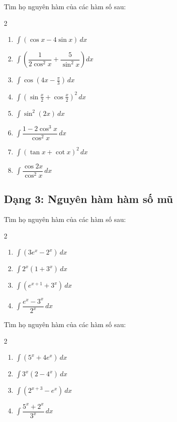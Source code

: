 \documentclass[12pt]{article}
\begin{document}
	\begin{btdo}
		Tìm họ nguyên hàm của các hàm số sau:
		\begin{multicols}{2}
			\begin{enumerate}[label=\alph*)]
				\item $\displaystyle \int (\cos x - 4\sin x) \,dx$
				\item $\displaystyle \int \left( \dfrac{1}{2\cos^2 x} + \dfrac{5}{\sin^2 x} \right) dx$
				\item $\displaystyle \int \cos\left(4x - \frac{\pi}{3}\right) \,dx$
				\item $\displaystyle \int \left(\sin \frac{x}{2} + \cos \frac{x}{2}\right)^2 \,dx$
				\item $\displaystyle \int \sin^2(2x) \,dx$
				\item $\displaystyle \int \dfrac{1 - 2\cos^3 x}{\cos^2 x} \,dx$
				\item $\displaystyle \int (\tan x + \cot x)^2 \,dx$
				\item $\displaystyle \int \dfrac{\cos 2x}{\cos^2 x} \,dx$
			\end{enumerate}
		\end{multicols}
	\end{btdo}
	
	\subsection{Dạng 3: Nguyên hàm hàm số mũ}
	
	\begin{btxanh}
		Tìm họ nguyên hàm của các hàm số sau:
		\begin{multicols}{2}
			\begin{enumerate}[label=\alph*)]
				\item $\displaystyle \int (3e^x - 2^x) \,dx$
				\item $\displaystyle \int 2^x(1 + 3^x) \,dx$
				\item $\displaystyle \int (e^{x+1} + 3^x) \,dx$
				\item $\displaystyle \int \dfrac{e^x - 3^x}{2^x} \,dx$
			\end{enumerate}
		\end{multicols}
	\end{btxanh}
	
	\begin{btvang}
		Tìm họ nguyên hàm của các hàm số sau:
		\begin{multicols}{2}
			\begin{enumerate}[label=\alph*)]
				\item $\displaystyle \int (5^x + 4e^x) \,dx$
				\item $\displaystyle \int 3^x(2 - 4^x) \,dx$
				\item $\displaystyle \int (2^{x+3} - e^x) \,dx$
				\item $\displaystyle \int \dfrac{5^x + 2^x}{3^x} \,dx$
			\end{enumerate}
		\end{multicols}
	\end{btvang}
	
\end{document}
